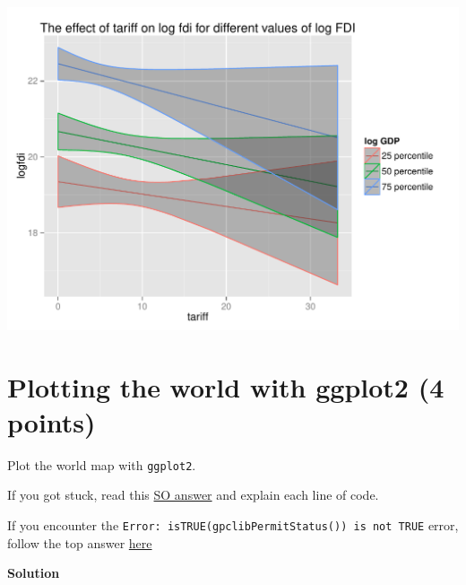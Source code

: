 \documentclass{article}\usepackage[]{graphicx}\usepackage[]{color}
\makeatletter
\def\maxwidth{ %
  \ifdim\Gin@nat@width>\linewidth
    \linewidth
  \else
    \Gin@nat@width
  \fi
}
\newenvironment{kframe}{%
 \def\at@end@of@kframe{}%
 \ifinner\ifhmode%
  \def\at@end@of@kframe{\end{minipage}}%
  \begin{minipage}{\columnwidth}%
 \fi\fi%
 \def\FrameCommand##1{\hskip\@totalleftmargin \hskip-\fboxsep
 \colorbox{shadecolor}{##1}\hskip-\fboxsep
     \hskip-\linewidth \hskip-\@totalleftmargin \hskip\columnwidth}%
 \MakeFramed {\advance\hsize-\width
   \@totalleftmargin\z@ \linewidth\hsize
   \@setminipage}}%
 {\par\unskip\endMakeFramed%
 \at@end@of@kframe}
\newenvironment{knitrout}{}{} %
\makeatother
\begin{document}
\begin{knitrout}
\begin{kframe}
{\ttfamily\noindent\color{warningcolor}{\#\# Warning: Removed 282 rows containing missing values (geom\_path).}}\end{kframe}
\includegraphics[width=\maxwidth]{figure/unnamed-chunk-4-1} 

\end{knitrout}

\section{Plotting the world with ggplot2 (4 points)}

Plot the world map with \verb`ggplot2`.

If you got stuck, read this \href{http://stackoverflow.com/questions/9805895/mapping-the-world-on-ggplot2}{SO answer} and explain each line of code.

If you encounter the \verb`Error: isTRUE(gpclibPermitStatus()) is not TRUE` error, follow the top answer \href{http://stackoverflow.com/questions/30790036/error-istruegpclibpermitstatus-is-not-true}{here}

\textbf{Solution}
\end{document}
